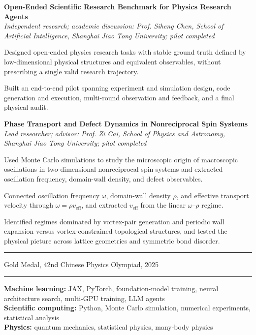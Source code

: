 \documentclass[10pt,a4paper]{article}
\let\originalitemize\itemize
\let\endoriginalitemize\enditemize
\renewenvironment{itemize}
  {\originalitemize
   \setlength{\itemsep}{1.4pt}
   \setlength{\topsep}{2.2pt}
   \setlength{\parsep}{0pt}
   \setlength{\partopsep}{0pt}}
  {\endoriginalitemize}
\newcommand{\cvsection}[1]{
  \vspace{0.48em}{\large\bfseries #1}\par
  \vspace{0.08em}\hrule\vspace{0.3em}
}
\newcommand{\project}[2]{
  \textbf{#1}\\[-1pt]
  \textit{#2}
}
\begin{document}
\project
  {Open-Ended Scientific Research Benchmark for Physics Research Agents}
  {Independent research; academic discussion: Prof. Siheng Chen, School of Artificial Intelligence, Shanghai Jiao Tong University; pilot completed}

\begin{itemize}
  \item Designed open-ended physics research tasks with stable ground truth
  defined by low-dimensional physical structures and equivalent observables,
  without prescribing a single valid research trajectory.
  \item Built an end-to-end pilot spanning experiment and simulation design,
  code generation and execution, multi-round observation and feedback, and a
  final physical audit.
\end{itemize}

\project
  {Phase Transport and Defect Dynamics in Nonreciprocal Spin Systems}
  {Lead researcher; advisor: Prof. Zi Cai, School of Physics and Astronomy, Shanghai Jiao Tong University; pilot completed}

\begin{itemize}
  \item Used Monte Carlo simulations to study the microscopic origin of
  macroscopic oscillations in two-dimensional nonreciprocal spin systems and
  extracted oscillation frequency, domain-wall density, and defect observables.
  \item Connected oscillation frequency $\omega$, domain-wall density $\rho$,
  and effective transport velocity through $\omega=\rho v_{\mathrm{eff}}$, and
  extracted $v_{\mathrm{eff}}$ from the linear $\omega$--$\rho$ regime.
  \item Identified regimes dominated by vortex-pair generation and periodic
  wall expansion versus vortex-constrained topological structures, and tested
  the physical picture across lattice geometries and symmetric bond disorder.
\end{itemize}

\cvsection{Honors}

Gold Medal, 42nd Chinese Physics Olympiad, 2025

\cvsection{Technical Skills}

\textbf{Machine learning:} JAX, PyTorch, foundation-model training, neural
architecture search, multi-GPU training, LLM agents\\
\textbf{Scientific computing:} Python, Monte Carlo simulation, numerical
experiments, statistical analysis\\
\textbf{Physics:} quantum mechanics, statistical physics, many-body physics
\end{document}
